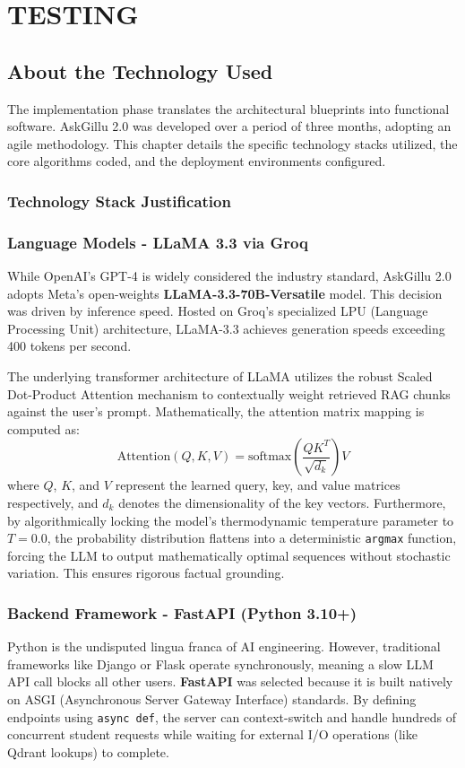 \documentclass[12pt,a4paper]{report}
\begin{document}
\chapter{TESTING}

\section{About the Technology Used}
The implementation phase translates the architectural blueprints into functional software. AskGillu 2.0 was developed over a period of three months, adopting an agile methodology. This chapter details the specific technology stacks utilized, the core algorithms coded, and the deployment environments configured.

\subsection{Technology Stack Justification}
\subsection{Language Models - LLaMA 3.3 via Groq}
While OpenAI's GPT-4 is widely considered the industry standard, AskGillu 2.0 adopts Meta's open-weights \textbf{LLaMA-3.3-70B-Versatile} model. This decision was driven by inference speed. Hosted on Groq's specialized LPU (Language Processing Unit) architecture, LLaMA-3.3 achieves generation speeds exceeding 400 tokens per second. 

The underlying transformer architecture of LLaMA utilizes the robust Scaled Dot-Product Attention mechanism to contextually weight retrieved RAG chunks against the user's prompt. Mathematically, the attention matrix mapping is computed as:
\begin{equation}
    \text{Attention}(Q, K, V) = \text{softmax}\left(\frac{QK^T}{\sqrt{d_k}}\right)V
\end{equation}
where $Q$, $K$, and $V$ represent the learned query, key, and value matrices respectively, and $d_k$ denotes the dimensionality of the key vectors. Furthermore, by algorithmically locking the model's thermodynamic temperature parameter to $T=0.0$, the probability distribution flattens into a deterministic \texttt{argmax} function, forcing the LLM to output mathematically optimal sequences without stochastic variation. This ensures rigorous factual grounding.
\subsection{Backend Framework - FastAPI (Python 3.10+)}
Python is the undisputed lingua franca of AI engineering. However, traditional frameworks like Django or Flask operate synchronously, meaning a slow LLM API call blocks all other users. \textbf{FastAPI} was selected because it is built natively on ASGI (Asynchronous Server Gateway Interface) standards. By defining endpoints using \texttt{async def}, the server can context-switch and handle hundreds of concurrent student requests while waiting for external I/O operations (like Qdrant lookups) to complete.
\end{document}
